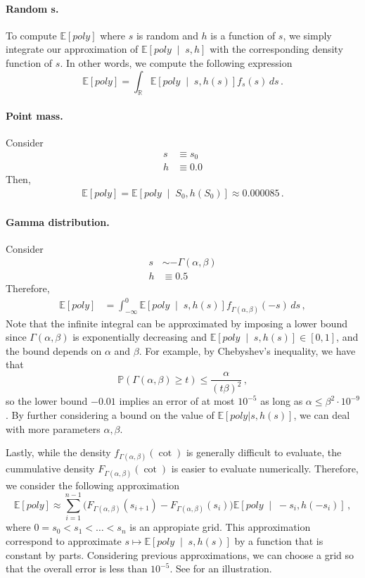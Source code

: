 \documentclass[a4paper,11pt]{article}
\newcommand{\EE}{\mathbb{E}}
\newcommand{\PP}{\mathbb{P}}
\newcommand{\RR}{\mathbb{R}}
\newcommand{\1}{\mathds{1}}
\newcommand{\cond}{\;\middle\vert\;}
\theoremstyle{plain} %
\theoremstyle{definition} %
\theoremstyle{remark} %
\begin{document}
\paragraph{Random s.}
To compute $\EE[poly]$ where $s$ is random and $h$ is a function of $s$, we simply integrate our approximation of $\EE \left[ poly \cond s, h \right]$ with the corresponding density function of $s$. 
In other words, we compute the following expression
\[
	\EE \left[ poly \right] = \int_{\RR} \EE \left[ poly \cond s, h(s) \right] f_s(s) \, ds \,.
\]

\paragraph{Point mass.}
Consider
\begin{align*}
	s &\equiv s_0 \\
	h &\equiv 0.0
\end{align*}
Then, 
\begin{align*}
	\EE[poly] 
		= \EE \left[ poly \cond S_0, h(S_0) \right]
		\approx 0.000085 \,.
\end{align*}



\paragraph{Gamma distribution.}
Consider 
\begin{align*}
	s &\sim -\Gamma(\alpha, \beta) \\
	h &\equiv 0.5
\end{align*}
Therefore, 
\begin{align*}
	\EE[poly] 
		&= \int_{-\infty}^{0} \EE \left[ poly \cond s, h(s) \right] f_{\Gamma(\alpha, \beta)}(-s) \, ds \,,
\end{align*}
Note that the infinite integral can be approximated by imposing a lower bound since $\Gamma(\alpha, \beta)$ is exponentially decreasing and $\EE \left[ poly \cond s, h(s) \right] \in [0, 1]$, and the bound depends on $\alpha$ and $\beta$.
For example, by Chebyshev's inequality, we have that
\[
	\PP( \Gamma(\alpha, \beta) \ge t ) \le \frac{\alpha}{(t \beta)^2} \,, 
\]
so the lower bound $-0.01$ implies an error of at most $10^{-5}$ as long as $\alpha \le \beta^2 \cdot 10^{-9}$.
By further considering a bound on the value of $\EE [poly | s, h(s)]$, we can deal with more parameters $\alpha, \beta$.

Lastly, while the density $f_{\Gamma(\alpha, \beta)}(\cot)$ is generally difficult to evaluate, the cummulative density $F_{\Gamma(\alpha, \beta)}(\cot)$ is easier to evaluate numerically.
Therefore, we consider the following approximation
\[
	\EE[poly] 
			\approx \sum_{i = 1}^{n - 1} \big( F_{\Gamma(\alpha, \beta)}(s_{i + 1}) - F_{\Gamma(\alpha, \beta)}(s_{i}) \big) \EE \left[ poly \cond -s_{i}, h(-s_{i}) \right] \,,
\]
where $0 = s_0 < s_1 < \ldots < s_n$ is an appropiate grid.
This approximation correspond to approximate $s \mapsto \EE \left[ poly \cond s, h(s) \right]$ by a function that is constant by parts.
Considering previous approximations, we can choose a grid so that the overall error is less than $10^{-5}$.
See  for an illustration.
\end{document}

